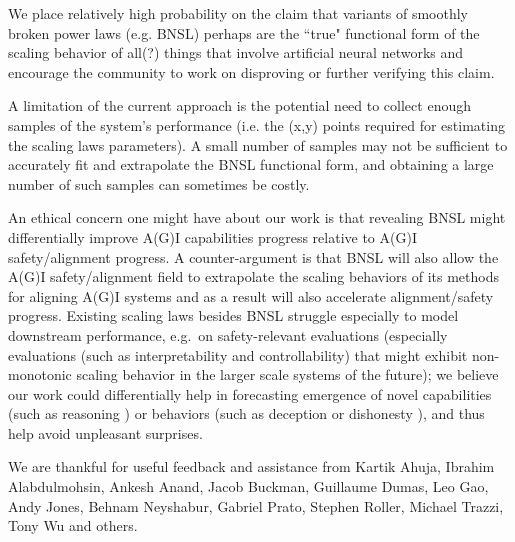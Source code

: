 \documentclass{article} %
\begin{document}
 We place relatively high probability on the claim that variants of smoothly broken power laws (e.g. BNSL) perhaps are the ``true" functional form of the scaling behavior of all(?) things that involve artificial neural networks and encourage the community to work on disproving or further verifying this claim.

 A limitation of the current approach is the potential need to collect enough samples of the system's performance (i.e. the (x,y) points required for estimating the scaling laws parameters). A small number of samples may not be sufficient to accurately fit and extrapolate the BNSL functional form, and obtaining a large number of such samples can sometimes be costly.

 An ethical concern one might have about our work is that revealing BNSL might differentially \citep{hendrycks2022x} improve A(G)I capabilities progress relative to A(G)I safety/alignment progress. 
A counter-argument is that BNSL will also allow the A(G)I safety/alignment field to extrapolate the scaling behaviors of its methods for aligning A(G)I systems and as a result will also accelerate alignment/safety progress.
Existing scaling laws besides BNSL struggle especially to model downstream performance, e.g.\ on safety-relevant evaluations (especially evaluations (such as interpretability and controllability) that might exhibit non-monotonic scaling behavior in the larger scale systems of the future); we believe our work could differentially help in forecasting emergence of novel capabilities (such as reasoning \citep{wei2022chain}) or behaviors (such as deception or dishonesty \citep{evans2021truthful,lin2021truthfulqa}), and thus help avoid unpleasant surprises.

 We are thankful for useful feedback and assistance from Kartik Ahuja, Ibrahim Alabdulmohsin, Ankesh Anand, Jacob Buckman, Guillaume Dumas, Leo Gao, Andy Jones, Behnam Neyshabur, Gabriel Prato, Stephen Roller, Michael Trazzi, Tony Wu and others.
\end{document}
